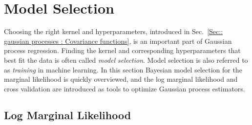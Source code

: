 \documentclass[twoside,english]{uiofysmaster}
\begin{document}
\section{Model Selection}

Choosing the right kernel and hyperparameters, introduced in Sec.~\ref{Sec:: gaussian processes : Covariance functions}, is an important part of Gaussian process regression. Finding the  kernel and corresponding hyperparameters that best fit the data is often called \textit{model selection}. Model selection is also referred to as \textit{training} in machine learning. In this section Bayesian model selection for the marginal likelihood is quickly overviewed, and the log marginal likelihood and cross validation are introduced as tools to optimize Gaussian process estimators.

\subsection{Log Marginal Likelihood}\label{Sec:: gaussian process : Log Marginal Likelihood}
\end{document}
